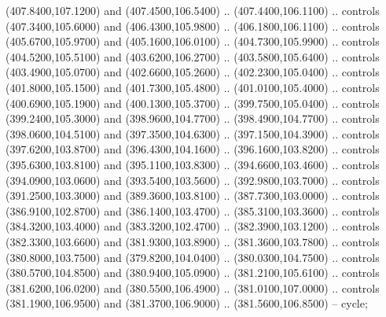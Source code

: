 {\begin{scope}[y=0.80pt, x=0.80pt, yscale=-1, xscale=1, inner sep=0pt, outer sep=0pt, #1]
      (407.8400,107.1200) and (407.4500,106.5400) .. (407.4400,106.1100) .. controls
      (407.3400,105.6000) and (406.4300,105.9800) .. (406.1800,106.1100) .. controls
      (405.6700,105.9700) and (405.1600,106.0100) .. (404.7300,105.9900) .. controls
      (404.5200,105.5100) and (403.6200,106.2700) .. (403.5800,105.6400) .. controls
      (403.4900,105.0700) and (402.6600,105.2600) .. (402.2300,105.0400) .. controls
      (401.8000,105.1500) and (401.7300,105.4800) .. (401.0100,105.4000) .. controls
      (400.6900,105.1900) and (400.1300,105.3700) .. (399.7500,105.0400) .. controls
      (399.2400,105.3000) and (398.9600,104.7700) .. (398.4900,104.7700) .. controls
      (398.0600,104.5100) and (397.3500,104.6300) .. (397.1500,104.3900) .. controls
      (397.6200,103.8700) and (396.4300,104.1600) .. (396.1600,103.8200) .. controls
      (395.6300,103.8100) and (395.1100,103.8300) .. (394.6600,103.4600) .. controls
      (394.0900,103.0600) and (393.5400,103.5600) .. (392.9800,103.7000) .. controls
      (391.2500,103.3000) and (389.3600,103.8100) .. (387.7300,103.0000) .. controls
      (386.9100,102.8700) and (386.1400,103.4700) .. (385.3100,103.3600) .. controls
      (384.3200,103.4000) and (383.3200,102.4700) .. (382.3900,103.1200) .. controls
      (382.3300,103.6600) and (381.9300,103.8900) .. (381.3600,103.7800) .. controls
      (380.8000,103.7500) and (379.8200,104.0400) .. (380.0300,104.7500) .. controls
      (380.5700,104.8500) and (380.9400,105.0900) .. (381.2100,105.6100) .. controls
      (381.6200,106.0200) and (380.5500,106.4900) .. (381.0100,107.0000) .. controls
      (381.1900,106.9500) and (381.3700,106.9000) .. (381.5600,106.8500) -- cycle;


\end{scope}}
